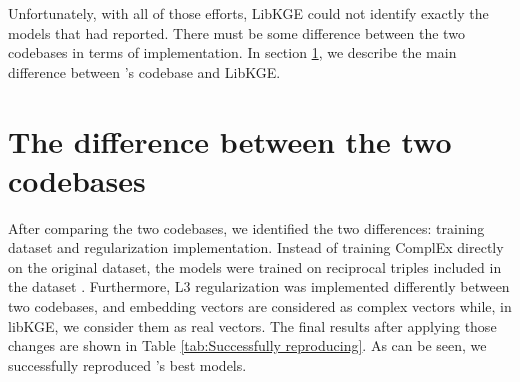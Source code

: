 Unfortunately, with all of those efforts, LibKGE could not identify exactly the models that \citet{chen2021relation} had reported. There must be some difference between the two codebases in terms of implementation. In section \ref{sec:The difference between the two codebases}, we describe the main difference between \cite{chen2021relation}'s codebase and LibKGE.



\section{The difference between the two codebases}
\label{sec:The difference between the two codebases}
After comparing the two codebases, we identified the two differences: training dataset and regularization implementation. Instead of training ComplEx directly on the original dataset, the models were trained on reciprocal triples included in the dataset \citep{chen2021relation}. Furthermore, L3 regularization was implemented differently between two codebases, and embedding vectors are considered as complex vectors while, in libKGE, we consider them as real vectors. The final results after applying those changes are shown in Table \ref{tab:Successfully reproducing}. As can be seen, we successfully reproduced \citet{chen2021relation}'s best models.

